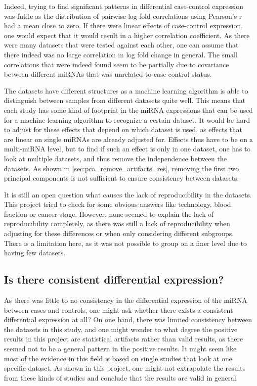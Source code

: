 Indeed, trying to find significant patterns in differential case-control expression was futile as the distribution of pairwise log fold correlations using Pearson's r had a mean close to zero. If there were linear effects of case-control expression, one would expect that it would result in a higher correlation coefficient. As there were many datasets that were tested against each other, one can assume that there indeed was no large correlation in log fold change in general. The small correlations that were indeed found seem to be partially due to covariance between different miRNAs that was unrelated to case-control status.

The datasets have different structures as a machine learning algorithm is able to distinguish between samples from different datasets quite well. This means that each study has some kind of footprint in the miRNA expressions that can be used for a machine learning algorithm to recognize a certain dataset. It would be hard to adjust for these effects that depend on which dataset is used, as effects that are linear on single miRNAs are already adjusted for. Effects thus have to be on a multi-miRNA level, but to find if such an effect is only in one dataset, one has to look at multiple datasets, and thus remove the independence between the datasets. As shown in \autoref{sec:pca_remove_artifacts_res}, removing the first two principal components is not sufficient to ensure consistency between datasets.

It is still an open question what causes the lack of reproducibility in the datasets. This project tried to check for some obvious answers like technology, blood fraction or cancer stage. However, none seemed to explain the lack of reproducibility completely, as there was still a lack of reproducibility when adjusting for these differences or when only considering different subgroups. There is a limitation here, as it was not possible to group on a finer level due to having few datasets.

\subsection{Is there consistent differential expression?}

As there was little to no consistency in the differential expression of the miRNA between cases and controls, one might ask whether there exists a consistent differential expression at all?
On one hand, there was limited consistency between the datasets in this study, and one might wonder to what degree the positive results in this project are statistical artifacts rather than valid results, as there seemed not to be a general pattern in the positive results.
It might seem like most of the evidence in this field is based on single studies that look at one specific dataset. As shown in this project, one might not extrapolate the results from these kinds of studies and conclude that the results are valid in general.

